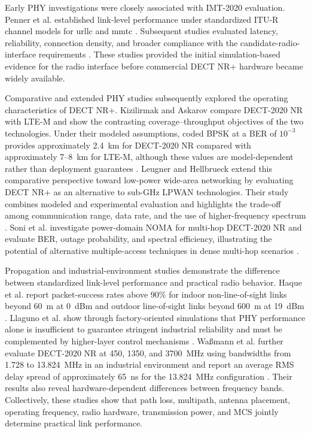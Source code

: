 Early PHY investigations were closely associated with IMT-2020 evaluation. Penner et al. established link-level performance under standardized ITU-R channel models for \gls{urllc} and \gls{mmtc} \cite{pennerLinkLevelPerformanceEvaluation2021}. Subsequent studies evaluated latency, reliability, connection density, and broader compliance with the candidate-radio-interface requirements \cite{dhanwaniAssessmentCandidateTechnology2020, pennerURLLCPerformanceEvaluation2021, maliatsosEvaluationIMT2020Candidate2022a, smidaETSIDECT2020Component2023}. These studies provided the initial simulation-based evidence for the radio interface before commercial DECT NR+ hardware became widely available.

Comparative and extended PHY studies subsequently explored the operating characteristics of DECT NR+. Kizilirmak and Askarov compare DECT-2020 NR with LTE-M and show the contrasting coverage--throughput objectives of the two technologies. Under their modeled assumptions, coded BPSK at a BER of $10^{-3}$ provides approximately 2.4~km for DECT-2020 NR compared with approximately 7--8~km for LTE-M, although these values are model-dependent rather than deployment guarantees \cite{kizilirmakExaminationPHYLayer2024}. Leugner and Hellbrueck extend this comparative perspective toward low-power wide-area networking by evaluating DECT NR+ as an alternative to sub-GHz LPWAN technologies. Their study combines modeled and experimental evaluation and highlights the trade-off among communication range, data rate, and the use of higher-frequency spectrum \cite{leugnerAlternativeSubGHzLPWAN2025a}. Soni et al. investigate power-domain NOMA for multi-hop DECT-2020 NR and evaluate BER, outage probability, and spectral efficiency, illustrating the potential of alternative multiple-access techniques in dense multi-hop scenarios \cite{soniLinkLevelAssessmentNOMA2023}.

Propagation and industrial-environment studies demonstrate the difference between standardized link-level performance and practical radio behavior. Haque et al. report packet-success rates above 90\% for indoor non-line-of-sight links beyond 60~m at 0~dBm and outdoor line-of-sight links beyond 600~m at 19~dBm \cite{haqueDECT2020NRLink2025}. Llaguno et al. show through factory-oriented simulations that PHY performance alone is insufficient to guarantee stringent industrial reliability and must be complemented by higher-layer control mechanisms \cite{llagunoPhysicalLayerPerformance2024}. Wa{\ss}mann et al. further evaluate DECT-2020 NR at 450, 1350, and 3700~MHz using bandwidths from 1.728 to 13.824~MHz in an industrial environment and report an average RMS delay spread of approximately 65~ns for the 13.824~MHz configuration \cite{wassmannPerformanceDECT2020NR2024}. Their results also reveal hardware-dependent differences between frequency bands. Collectively, these studies show that path loss, multipath, antenna placement, operating frequency, radio hardware, transmission power, and MCS jointly determine practical link performance.

